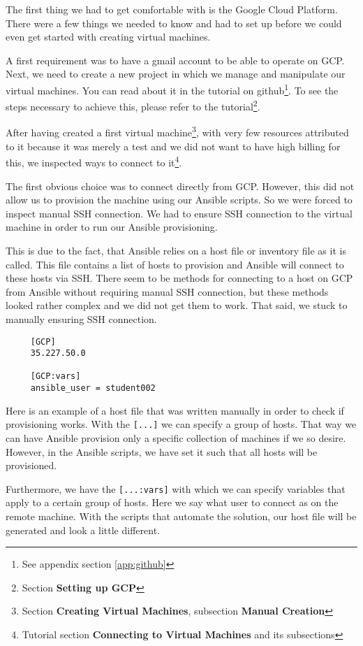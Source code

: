 The first thing we had to get comfortable with is the Google Cloud
Platform. There were a few things we needed to know and had to set up
before we could even get started with creating virtual machines.

A first requirement was to have a gmail account to be able to operate
on GCP. Next, we need to create a new project in which we manage and
manipulate our virtual machines.  You can read about it in the
tutorial on github\footnote{See appendix section \ref{app:github}}.
To see the steps necessary to achieve this, please refer to the
tutorial\footnote{Section \textbf{Setting up GCP}}.

After having created a first virtual machine\footnote{Section
\textbf{Creating Virtual Machines}, subsection \textbf{Manual
Creation}}, with very few resources attributed to it because it was
merely a test and we did not want to have high billing for this, we
inspected ways to connect to it\footnote{Tutorial section
\textbf{Connecting to Virtual Machines} and its subsections}.

The first obvious choice was to connect directly from GCP. However,
this did not allow us to provision the machine using our Ansible
scripts. So we were forced to inspect manual SSH connection. We had to
ensure SSH connection to the virtual machine in order to run our
Ansible provisioning. 

This is due to the fact, that Ansible relies on a host file or
inventory file as it is called. This file contains a list of hosts to
provision and Ansible will connect to these hosts via SSH. There seem
to be methods for connecting to a host on GCP from Ansible without
requiring manual SSH connection, but these methods looked rather
complex and we did not get them to work. That said, we stuck to
manually ensuring SSH connection.

\begin{verbatim}
	 [GCP]
	 35.227.50.0

	 [GCP:vars]
	 ansible_user = student002
\end{verbatim}

Here is an example of a host file that was written manually in order
to check if provisioning works. With the \verb|[...]| we can specify a
group of hosts. That way we can have Ansible provision only a specific
collection of machines if we so desire. However, in the Ansible
scripts, we have set it such that all hosts will be provisioned.

Furthermore, we have the \verb|[...:vars]| with which we can specify
variables that apply to a certain group of hosts. Here we say what
user to connect as on the remote machine. With the scripts that
automate the solution, our host file will be generated and look a
little different.

